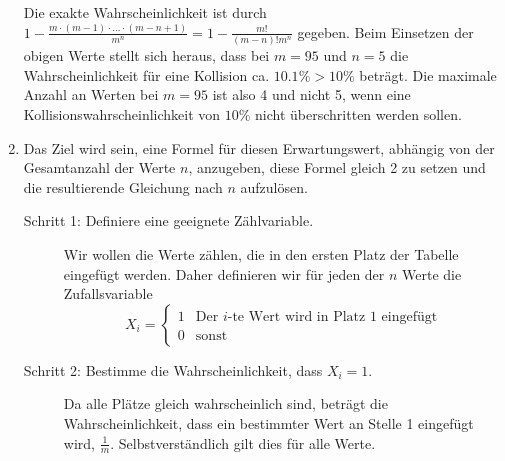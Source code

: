 \documentclass[11pt,a4paper]{article}
\begin{document}
\begin{loesung}
\begin{enumerate}
        Die exakte Wahrscheinlichkeit ist durch $1 - \frac{m \cdot (m - 1) \cdot \ldots \cdot (m - n + 1)}{m^n} = 1 - \frac{m!}{(m - n)! m^n}$ gegeben.
        Beim Einsetzen der obigen Werte stellt sich heraus, dass bei $m = 95$ und $n = 5$ die Wahrscheinlichkeit für eine Kollision ca. $10.1\% > 10\%$ beträgt.
        Die maximale Anzahl an Werten bei $m = 95$ ist also 4 und nicht 5, wenn eine Kollisionswahrscheinlichkeit von $10\%$ nicht überschritten werden sollen.
        
        \item 
        Das Ziel wird sein, eine Formel für diesen Erwartungswert, abhängig von der Gesamtanzahl der Werte $n$, anzugeben, diese Formel gleich 2 zu setzen und die resultierende Gleichung nach $n$ aufzulösen.
        \begin{description}
            \item[Schritt 1: Definiere eine geeignete Zählvariable.]
            Wir wollen die Werte zählen, die in den ersten Platz der Tabelle eingefügt werden.
            Daher definieren wir für jeden der $n$ Werte die Zufallsvariable
            \begin{equation*}
                X_i = \begin{cases}
                    1 & \text{Der $i$-te Wert wird in Platz 1 eingefügt} \\
                    0 & \text{sonst}
                \end{cases}
            \end{equation*}
            \item[Schritt 2: Bestimme die Wahrscheinlichkeit, dass $X_i = 1$.]
            Da alle Plätze gleich wahrscheinlich sind, beträgt die Wahrscheinlichkeit, dass ein bestimmter Wert an Stelle 1 eingefügt wird, $\frac{1}{m}$.
            Selbstverständlich gilt dies für alle Werte.

\end{description}
\end{enumerate}
\end{loesung}
\end{document}
